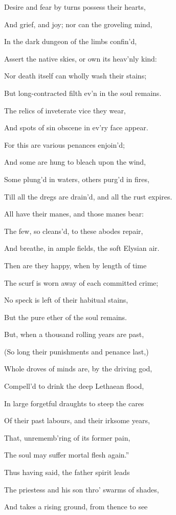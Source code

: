 Desire and fear by turns possess their hearts,

And grief, and joy; nor can the groveling mind,

In the dark dungeon of the limbs confin’d,

Assert the native skies, or own its heav’nly kind:

Nor death itself can wholly wash their stains;

But long-contracted filth ev’n in the soul remains.

The relics of inveterate vice they wear,

And spots of sin obscene in ev’ry face appear.

For this are various penances enjoin’d;

And some are hung to bleach upon the wind,

Some plung’d in waters, others purg’d in fires,

Till all the dregs are drain’d, and all the rust expires.

All have their manes, and those manes bear:

The few, so cleans’d, to these abodes repair,

And breathe, in ample fields, the soft Elysian air.

Then are they happy, when by length of time

The scurf is worn away of each committed crime;

No speck is left of their habitual stains,

But the pure ether of the soul remains.

But, when a thousand rolling years are past,

(So long their punishments and penance last,)

Whole droves of minds are, by the driving god,

Compell’d to drink the deep Lethaean flood,

In large forgetful draughts to steep the cares

Of their past labours, and their irksome years,

That, unrememb’ring of its former pain,

The soul may suffer mortal flesh again.”

Thus having said, the father spirit leads

The priestess and his son thro’ swarms of shades,

And takes a rising ground, from thence to see

